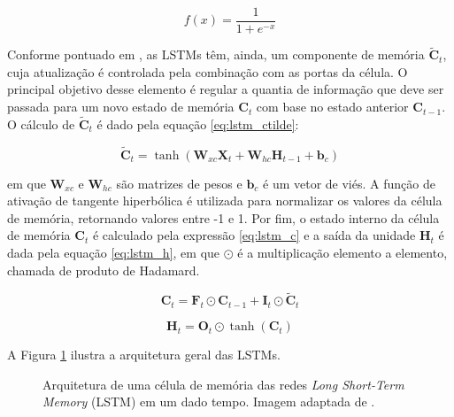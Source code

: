 \begin{equation}
    \label{eq:sigmoid}
    f(x) = \frac{1}{1 + e^{-x}}
\end{equation}

Conforme pontuado em \cite{schmidt2019recurrent}, as LSTMs têm, ainda, um componente de memória $\boldsymbol{\tilde{C}}_{t}$, cuja atualização é controlada pela combinação com as portas da célula. O principal objetivo desse elemento é regular a quantia de informação que deve ser passada para um novo estado de memória $\boldsymbol{C}_{t}$ com base no estado anterior $\boldsymbol{C}_{t-1}$. O cálculo de $\boldsymbol{\tilde{C}}_{t}$ é dado pela equação \ref{eq:lstm_ctilde}:

\begin{equation}
    \label{eq:lstm_ctilde}
    \boldsymbol{\tilde{C}}_{t} = \tanh \left( \boldsymbol{W}_{xc} \boldsymbol{X}_{t} + \boldsymbol{W}_{hc} \boldsymbol{H}_{t-1} + \boldsymbol{b}_{c} \right)
\end{equation}

em que $\boldsymbol{W}_{xc}$ e $\boldsymbol{W}_{hc}$ são matrizes de pesos e $\boldsymbol{b}_{c}$ é um vetor de viés. A função de ativação de tangente hiperbólica é utilizada para normalizar os valores da célula de memória, retornando valores entre -1 e 1. Por fim, o estado interno da célula de memória $\boldsymbol{C}_{t}$ é calculado pela expressão \ref{eq:lstm_c} e a saída da unidade $\boldsymbol{H}_{t}$ é dada pela equação \ref{eq:lstm_h}, em que $\odot$ é a multiplicação elemento a elemento, chamada de produto de Hadamard.

\begin{equation}
    \label{eq:lstm_c}
    \boldsymbol{C}_{t} = \boldsymbol{F}_{t} \odot \boldsymbol{C}_{t-1} + \boldsymbol{I}_{t} \odot \boldsymbol{\tilde{C}}_{t}
\end{equation}

\begin{equation}
    \label{eq:lstm_h}
    \boldsymbol{H}_{t} = \boldsymbol{O}_{t} \odot \tanh(\boldsymbol{C}_{t})
\end{equation}

A Figura \ref{fig:lstm_architecture} ilustra a arquitetura geral das LSTMs.

\begin{figure}[H]
    \centering
    \caption{Arquitetura de uma célula de memória das redes \textit{Long Short-Term Memory} (LSTM) em um dado tempo. Imagem adaptada de \cite{zhang2023dive}.}
    \label{fig:lstm_architecture}
    
\end{figure}

